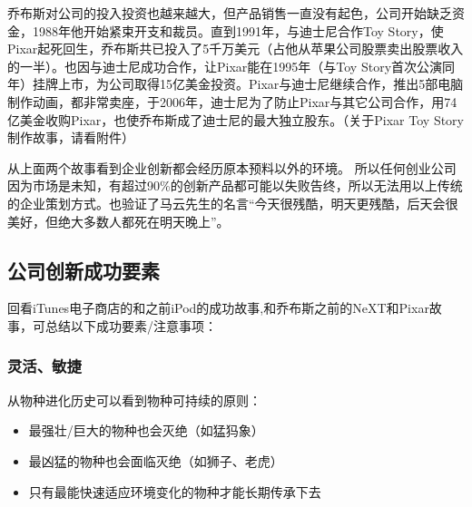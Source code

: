 乔布斯对公司的投入投资也越来越大，但产品销售一直没有起色，公司开始缺乏资金，1988年他开始紧束开支和裁员。直到1991年，与迪士尼合作Toy Story，使Pixar起死回生，乔布斯共已投入了5千万美元（占他从苹果公司股票卖出股票收入的一半）。也因与迪士尼成功合作，让Pixar能在1995年（与Toy Story首次公演同年）挂牌上市，为公司取得15亿美金投资。Pixar与迪士尼继续合作，推出5部电脑制作动画，都非常卖座，于2006年，迪士尼为了防止Pixar与其它公司合作，用74亿美金收购Pixar，也使乔布斯成了迪士尼的最大独立股东。（关于Pixar Toy Story制作故事，请看附件）


从上面两个故事看到企业创新都会经历原本预料以外的环境。
所以任何创业公司因为市场是未知，有超过90\%的创新产品都可能以失败告终，所以无法用以上传统的企业策划方式。也验证了马云先生的名言``今天很残酷，明天更残酷，后天会很美好，但绝大多数人都死在明天晚上''。

\hypertarget{ux516cux53f8ux521bux65b0ux6210ux529fux8981ux7d20}{%
\subsection{公司创新成功要素}\label{ux516cux53f8ux521bux65b0ux6210ux529fux8981ux7d20}}

回看iTunes电子商店的和之前iPod的成功故事,和乔布斯之前的NeXT和Pixar故事，可总结以下成功要素/注意事项：

\hypertarget{ux7075ux6d3bux654fux6377}{%
\subsubsection{灵活、敏捷}\label{ux7075ux6d3bux654fux6377}}

从物种进化历史可以看到物种可持续的原则：

\begin{itemize}
\tightlist
\item
  最强壮/巨大的物种也会灭绝（如猛犸象）
\item
  最凶猛的物种也会面临灭绝（如狮子、老虎）
\item
  只有最能快速适应环境变化的物种才能长期传承下去
\end{itemize}

